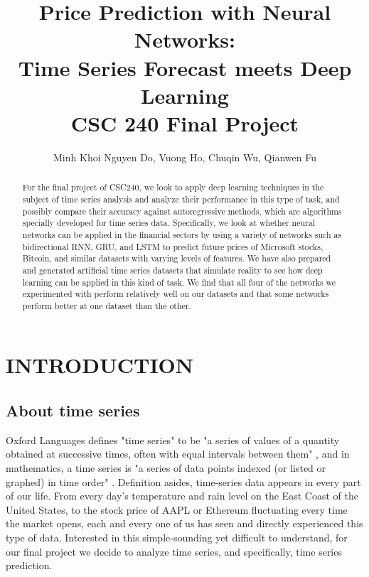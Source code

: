 \documentclass[letterpaper, 10 pt, conference]{ieeeconf}  %
\title{\LARGE
\textbf{Price Prediction with Neural Networks:\\ Time Series Forecast meets Deep Learning}\\
\Large
CSC 240 Final Project
}
\author{Minh Khoi Nguyen Do, Vuong Ho, Chuqin Wu, Qianwen Fu}
\begin{document}
\maketitle
\thispagestyle{empty}
\pagestyle{empty}


\begin{abstract}
    For the final project of CSC240, we look to apply deep learning techniques in the subject of time series analysis and analyze their performance in this type of task, and possibly compare their accuracy against autoregressive methods, which are algorithms specially developed for time series data. Specifically, we look at whether neural networks can be applied in the financial sectors by using a variety of networks such as bidirectional RNN, GRU, and LSTM to predict future prices of Microsoft stocks, Bitcoin, and similar datasets with varying levels of features. We have also prepared and generated artificial time series datasets that simulate reality to see how deep learning can be applied in this kind of task. We find that all four of the networks we experimented with perform relatively well on our datasets and that some networks perform better at one dataset than the other. 

\end{abstract}


\section{INTRODUCTION}
\subsection{About time series}
    Oxford Languages defines "time series" to be "a series of values of a quantity obtained at successive times, often with equal intervals between them" \cite{oxford}, and in mathematics, a time series is "a series of data points indexed (or listed or graphed) in time order" \cite{enwiki:1057905873}. Definition asides, time-series data appears in every part of our life. From every day's temperature and rain level on the East Coast of the United States, to the stock price of AAPL or Ethereum fluctuating every time the market opens, each and every one of us has seen and directly experienced this type of data. Interested in this simple-sounding yet difficult to understand, for our final project we decide to analyze time series, and specifically, time series prediction.
\end{document}
